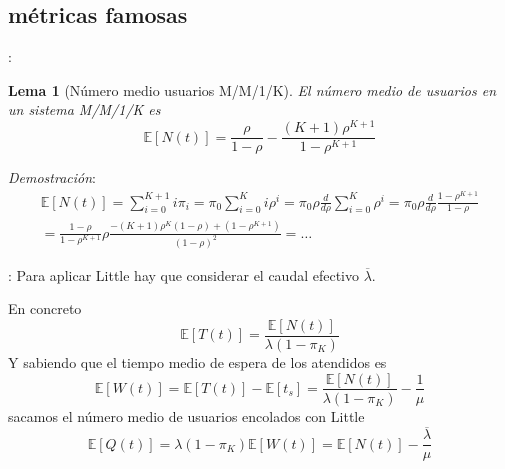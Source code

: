 \documentclass[xcolor={x11names}]{beamer}
\newtheorem{lema}{Lema}[section]
\begin{document}
\subsection{métricas famosas}
\begin{frame}{\secname: \subsecname}
    \begin{lema}[Número medio usuarios M/M/1/K]
        El número medio de usuarios en un
        sistema M/M/1/K es
        \begin{equation}
            \mathbb{E}[N(t)]=
            \frac{\rho}{1-\rho}-
            \frac{(K+1)\rho^{K+1}}{1-\rho^{K+1}}
        \end{equation}
    \end{lema}

    \vfill

    \textit{Demostración}:
    \begin{multline*}
        \mathbb{E}[N(t)]=
        \sum_{i=0}^{K+1}i \pi_i
        =\pi_0\sum_{i=0}^K i\rho^i
        =\pi_0\rho\frac{d}{d\rho}
        \sum_{i=0}^K\rho^i
        = \pi_0\rho \frac{d}{d\rho}
        \frac{1-\rho^{K+1}}{1-\rho}\\
        =\frac{1-\rho}{1-\rho^{K+1}}\rho
        \frac{-(K+1)\rho^K(1-\rho)+(1-\rho^{K+1})}{(1-\rho)^2}=\ldots
    \end{multline*}
\end{frame}



\begin{frame}{\secname: \subsecname}
    Para aplicar Little hay que considerar
    el caudal efectivo $\overline{\lambda}$.
    \begin{figure}
        \resizebox{!}{.15\textwidth}{%
            
        }
    \end{figure}
    En concreto
    \begin{equation*}
        \mathbb{E}[T(t)]=
        \frac{\mathbb{E}[N(t)]}{\lambda(1-\pi_K)}
    \end{equation*}
    Y sabiendo que el tiempo medio de
    espera de los atendidos es
    \begin{equation*}
        \mathbb{E}[W(t)]=
        \mathbb{E}[T(t)]-\mathbb{E}[t_s]
        =\frac{\mathbb{E}[N(t)]}{\lambda(1-\pi_K)}
        - \frac{1}{\mu}
    \end{equation*}
    sacamos el número medio de usuarios
    encolados con Little
    \begin{equation*}
        \mathbb{E}[Q(t)]=
        \lambda(1-\pi_K)
        \mathbb{E}[W(t)]=
        \mathbb{E}[N(t)]-
        \frac{\overline{\lambda}}{\mu}
    \end{equation*}
\end{frame}
\end{document}
